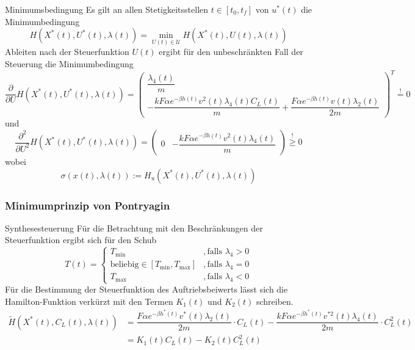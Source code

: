 \documentclass[aspectratio=169]{beamer}
\begin{document}
\begin{frame}
  \begin{block}{Minimumsbedingung}  
  \scriptsize
  Es gilt an allen Stetigkeitsstellen $t \in [t_0,t_f]$ von $u^{\ast}(t)$ die Minimumbedingung \[H(X^{\ast}(t),U^{\ast}(t),\lambda(t)) = \min_{U(t) \in \mathcal{U}} H(X^{\ast}(t),U(t),\lambda(t))\] Ableiten nach der Steuerfunktion $U(t)$ ergibt für den unbeschränkten Fall der Steuerung die Minimumbedingung
    \[\dfrac{\partial}{\partial U} H(X^{\ast}(t),U^{\ast}(t),\lambda(t)) = \begin{pmatrix}
    \dfrac{\lambda_4(t)}{m} \\ 
    - \dfrac{k F \alpha e^{-\beta h(t)} v^2(t) \lambda_4(t) C_L(t)}{m} + \dfrac{F \alpha e^{-\beta h(t)} v(t) \lambda_2(t)}{2m}
    \end{pmatrix}^T \stackrel{!}{=} 0\]
    und 
    \[\dfrac{\partial^2}{\partial U^2} H(X^{\ast}(t),U^{\ast}(t),\lambda(t)) = \begin{pmatrix}
    0 & - \dfrac{k F \alpha e^{-\beta h(t)} v^2(t) \lambda_4(t)}{m} 
    \end{pmatrix} \stackrel{!}{\geq} 0\] wobei \[\sigma(x(t),\lambda(t)) := H_u(X^{\ast}(t),U^{\ast}(t),\lambda(t))\] 
  \end{block}
\end{frame}

\begin{frame}
  \frametitle{Minimumprinzip von Pontryagin}
  \begin{block}{Synthesesteuerung}  
  \scriptsize
  Für die Betrachtung mit den Beschränkungen der Steuerfunktion ergibt sich für den Schub
\[T(t) = \left\lbrace \begin{array}{ll}
T_{\min} & ,\text{falls } \lambda_4 > 0  \\ 
\text{beliebig} \in [T_{\min},T_{\max}] & ,\text{falls } \lambda_4 = 0  \\ 
T_{\max} & ,\text{falls } \lambda_4 < 0
\end{array} \right.\]
Für die Bestimmung der Steuerfunktion des Auftriebsbeiwerts lässt sich die Hamilton-Funktion verkürzt mit den Termen $K_1(t)$ und $K_2(t)$ schreiben.
    \[\begin{split}
        \tilde{H}(X^{\ast}(t),C_L(t),\lambda(t)) &= \dfrac{F \alpha e^{-\beta h^{\ast}(t)} v^{\ast}(t) \lambda_2(t)}{2m} \cdot C_L(t) - \dfrac{k F \alpha e^{-\beta h^{\ast}(t)}  v^{\ast 2}(t) \lambda_4(t)}{2m} \cdot C_L^2(t) \\\
        &= K_1(t) C_L(t) - K_2(t) C_L^2(t)
    \end{split}\]
      \end{block}
\end{frame}
\end{document}
